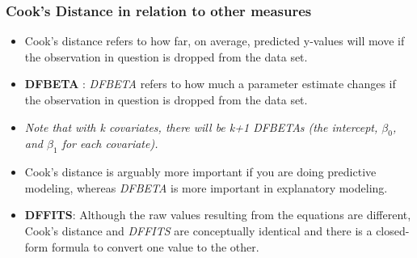 \documentclass[residuals.tex]{subfiles}
\begin{document}
\newpage	

\subsubsection*{Cook's Distance in relation to other measures}	

\begin{itemize}
\item Cook's distance refers to how far, on average, predicted y-values will move if the observation in question is dropped from the data set. 
\item \textbf{DFBETA} :  \textit{DFBETA} refers to how much a parameter estimate changes if the observation in question is dropped from the data set.

\item  \textit{Note that with k covariates, there will be k+1 DFBETAs (the intercept, $\beta_0$, and $\beta_1$ for each covariate).}
\item  Cook's distance is arguably more important if you are doing predictive modeling, whereas \textit{DFBETA} is more important in explanatory modeling.
\item \textbf{DFFITS}: Although the raw values resulting from the equations are different, Cook's distance and \textit{DFFITS} are conceptually identical and there is a closed-form formula to convert one value to the other.
\end{itemize}



\end{document}
